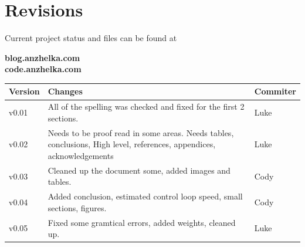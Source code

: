 \documentclass{article}
\numberwithin{equation}{section} %
\begin{document}
\section*{Revisions}
Current project status and files can be found at
\begin{center}
\bigskip \textbf{blog.anzhelka.com} \\
 \textbf{code.anzhelka.com} \\
 \bigskip
\end{center}

\begin{longtable}{l | p{5cm} | l}
\hline
\textbf{Version} & \textbf{Changes} & \textbf{Commiter}\\
\hline
v0.01 & All of the spelling was checked and fixed for the first 2 sections. & Luke \\
\hline
v0.02 & Needs to be proof read in some areas. Needs tables, conclusions, High level, references, appendices, acknowledgements & Luke \\
\hline
v0.03 & Cleaned up the document some, added images and tables. & Cody \\
\hline
v0.04 & Added conclusion, estimated control loop speed, small sections, figures. & Cody \\
\hline
v0.05 & Fixed some gramtical errors, added weights, cleaned up. & Luke \\
\hline
\end{longtable}


\newpage
\renewcommand{\contentsname}{Table of Contents}
\tableofcontents
{}
\newpage



\end{document}
